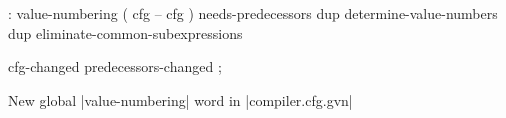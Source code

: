\centering

  \begin{factorcode}
    : value-numbering ( cfg -- cfg )
        needs-predecessors
        dup determine-value-numbers
        dup eliminate-common-subexpressions

        cfg-changed predecessors-changed ;
  \end{factorcode}

\caption{New global \factor|value-numbering| word in \factor|compiler.cfg.gvn|}

